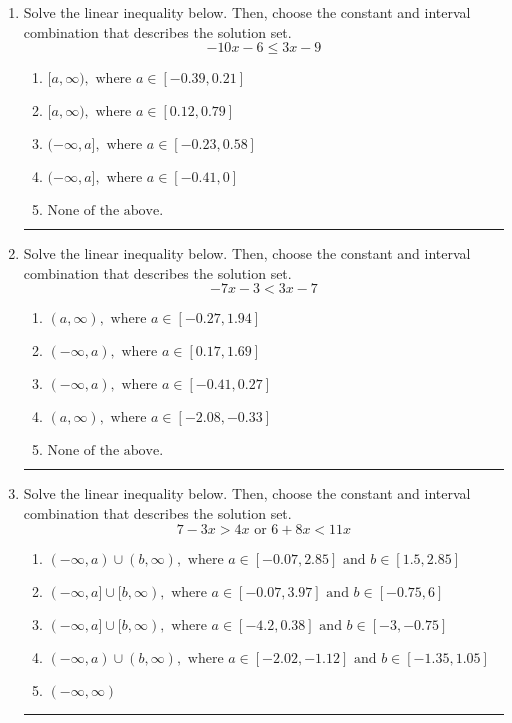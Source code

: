 \documentclass[14pt]{extbook}
\newcommand{\litem}[1]{\item#1\hspace*{-1cm}\rule{\textwidth}{0.4pt}}
\begin{document}
\begin{enumerate}
{\begin{enumerate}[label=\Alph*.]
\end{enumerate} }
\litem{
Solve the linear inequality below. Then, choose the constant and interval combination that describes the solution set.\[ -10x -6 \leq 3x -9 \]\begin{enumerate}[label=\Alph*.]
\item \( [a, \infty), \text{ where } a \in [-0.39, 0.21] \)
\item \( [a, \infty), \text{ where } a \in [0.12, 0.79] \)
\item \( (-\infty, a], \text{ where } a \in [-0.23, 0.58] \)
\item \( (-\infty, a], \text{ where } a \in [-0.41, 0] \)
\item \( \text{None of the above}. \)

\end{enumerate} }
\litem{
Solve the linear inequality below. Then, choose the constant and interval combination that describes the solution set.\[ -7x -3 < 3x -7 \]\begin{enumerate}[label=\Alph*.]
\item \( (a, \infty), \text{ where } a \in [-0.27, 1.94] \)
\item \( (-\infty, a), \text{ where } a \in [0.17, 1.69] \)
\item \( (-\infty, a), \text{ where } a \in [-0.41, 0.27] \)
\item \( (a, \infty), \text{ where } a \in [-2.08, -0.33] \)
\item \( \text{None of the above}. \)

\end{enumerate} }
\litem{
Solve the linear inequality below. Then, choose the constant and interval combination that describes the solution set.\[ 7 - 3 x > 4 x \text{ or } 6 + 8 x < 11 x \]\begin{enumerate}[label=\Alph*.]
\item \( (-\infty, a) \cup (b, \infty), \text{ where } a \in [-0.07, 2.85] \text{ and } b \in [1.5, 2.85] \)
\item \( (-\infty, a] \cup [b, \infty), \text{ where } a \in [-0.07, 3.97] \text{ and } b \in [-0.75, 6] \)
\item \( (-\infty, a] \cup [b, \infty), \text{ where } a \in [-4.2, 0.38] \text{ and } b \in [-3, -0.75] \)
\item \( (-\infty, a) \cup (b, \infty), \text{ where } a \in [-2.02, -1.12] \text{ and } b \in [-1.35, 1.05] \)
\item \( (-\infty, \infty) \)


\end{enumerate}}
\end{enumerate}
\end{document}
